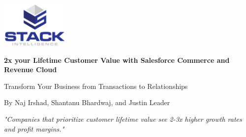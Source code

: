 \begin{titlepage}
\pagecolor{white}
\begin{center}

\vspace*{1cm}
\includegraphics[width=0.25\textwidth]{../brand-assets/images/Stack Intelligence With Logo.png}

\vspace{3cm}

{\fontsize{32pt}{38pt}\selectfont\textcolor[HTML]{2a368e}\textbf{2x your Lifetime Customer Value with Salesforce Commerce and Revenue Cloud}}

\vspace{1cm}

{\fontsize{20pt}{24pt}\selectfont\textcolor[HTML]{2a368e} Transform Your Business from Transactions to Relationships}

\vspace{3cm}

{\Large\textcolor[HTML]{000000} By Naj Irshad, Shantanu Bhardwaj, and Justin Leader}

\vspace{1cm}

{\large\textcolor[HTML]{EB7527} \textit{"Companies that prioritize customer lifetime value see 2-3x higher growth rates and profit margins."}}

\end{center}
\end{titlepage}
\pagecolor{white}